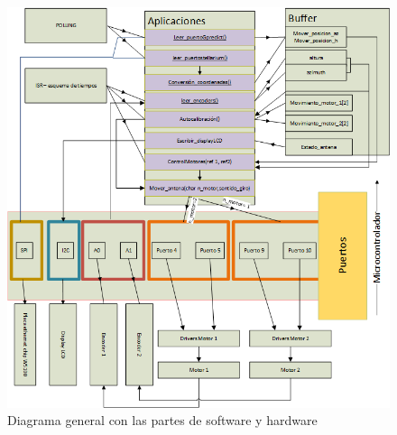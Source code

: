 \begin{figure}[ht!]
	\raggedleft
	\includegraphics[width=\linewidth]{software_diagrama_general}
	\caption{Diagrama general con las partes de software y hardware}
	\label{fig:software_diagrama_general}
\end{figure}


\vspace{20mm}

